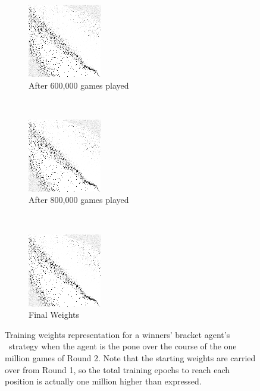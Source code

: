 \begin{figure}
	\begin{subfigure}[t]{0.3\textwidth}
	\centering
	\includegraphics[width=\stratgraphwidth]{images/findings/round2/flipbook/winner/checkpoint_600000.png}
	\caption{After 600,000 games played}
	\end{subfigure}
	~
	\begin{subfigure}[t]{0.3\textwidth}
	\centering
	\includegraphics[width=\stratgraphwidth]{images/findings/round2/flipbook/winner/checkpoint_800000.png}
	\caption{After 800,000 games played}
	\end{subfigure}
	~
	\begin{subfigure}[t]{0.3\textwidth}
	\centering
	\includegraphics[width=\stratgraphwidth]{images/findings/round2/flipbook/winner/checkpoint_999999.png}
	\caption{Final Weights}
	\end{subfigure}

\caption{
	Training weights representation for a winners' bracket agent's \handmaxavg\
	strategy when the agent is the pone
	over the course of the one million games of Round 2.
	Note that the starting weights are carried over from Round 1,
	so the total training epochs to reach each position is actually
	one million higher than expressed.
}
\label{fig:r2-flip-winner}
\end{figure}
